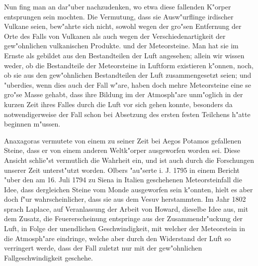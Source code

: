 \documentclass[a4paper, 11pt, oneside]{article}
\begin{document}
Nun fing man an dar"uber nachzudenken, wo etwa diese fallenden K"orper entsprungen sein mochten. Die Vermutung, dass sie Ausw"urflinge irdischer Vulkane seien, bew"ahrte sich nicht, sowohl wegen der gro"sen Entfernung der Orte des Falls von Vulkanen als auch wegen der Verschiedenartigkeit der gew"ohnlichen vulkanischen Produkte. und der Meteorsteine. Man hat sie im Ernste als gebildet aus den Bestandteilen der Luft angesehen; allein wir wissen weder, ob die Bestandteile der Meteorsteine in Luftform existieren k"onnen, noch, ob sie aus den gew"ohnlichen Bestandteilen der Luft zusammengesetzt seien; und "uberdies, wenn dies auch der Fall w"are, haben doch mehre Meteorsteine eine se gro"se Masse gehabt, dass ihre Bildung im der Atmosph"are unm"oglich in der kurzen Zeit ihres Falles durch die Luft vor sich gehen konnte, besonders da notwendigerweise der Fall schon bei Absetzung des ersten festen Teilchens h"atte beginnen m"ussen.

Anaxagoras vermutete von einem zu seiner Zeit bei Aegos Potamos gefallenen Steine, dass er von einem anderen Weltk"orper ausgeworfen worden sei. Diese Ansicht schlie"st vermutlich die Wahrheit ein, und ist auch durch die Forschungen unserer Zeit unterst"utzt worden. Olbers "au"serte i. J. 1795 in einem Bericht "uber den am 16. Juli 1794 zu Siena in Italien geschehenen Meteorsteinfall die Idee, dass dergleichen Steine vom Monde ausgeworfen sein k"onnten, hielt es aber doch f"ur wahrscheinlicher, dass sie aus dem Vesuv herstammten. Im Jahr 1802 sprach Laplace, auf Veranlassung der Arbeit von Howard, dieselbe Idee aus, mit dem Zusatz, die Feuererscheinung entspringe aus der Zusammendr"uckung der Luft, in Folge der unendlichen Geschwindigkeit, mit welcher der Meteorstein in die Atmosph"are eindringe, welche aber durch den Widerstand der Luft so verringert werde, dass der Fall zuletzt nur mit der gew"ohnlichen Fallgeschwindigkeit geschehe.
\end{document}
